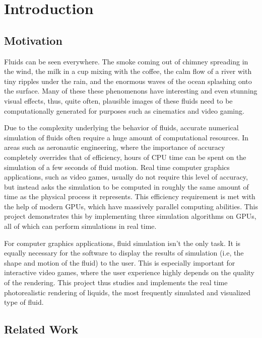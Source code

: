 \chapter{Introduction}

\section{Motivation}
Fluids can be seen everywhere. The smoke coming out of chimney spreading in the wind, the milk in a cup mixing with the coffee, the calm flow of a river with tiny ripples under the rain, and the enormous waves of the ocean splashing onto the surface. Many of these these phenomenons have interesting and even stunning visual effects, thus, quite often, plausible images of these fluids need to be computationally generated for purposes such as cinematics and video gaming. 

Due to the complexity underlying the behavior of fluids, accurate numerical simulation of fluids often require a huge amount of computational resources. In areas such as aeronautic engineering, where the importance of accuracy completely overrides that of efficiency, hours of CPU time can be spent on the simulation of a few seconds of fluid motion. Real time computer graphics applications, such as video games, usually do not require this level of accuracy, but instead asks the simulation to be computed in roughly the same amount of time as the physical process it represents. This efficiency requirement is met with the help of modern GPUs, which have massively parallel computing abilities. This project demonstrates this by implementing three simulation algorithms on GPUs, all of which can perform simulations in real time.

For computer graphics applications, fluid simulation isn't the only task. It is equally necessary for the software to display the results of simulation (i.e, the shape and motion of the fluid) to the user. This is especially important for interactive video games, where the user experience highly depends on the quality of the rendering. This project thus studies and implements the real time photorealistic rendering of liquids, the most frequently simulated and visualized type of fluid.






\section{Related Work}



